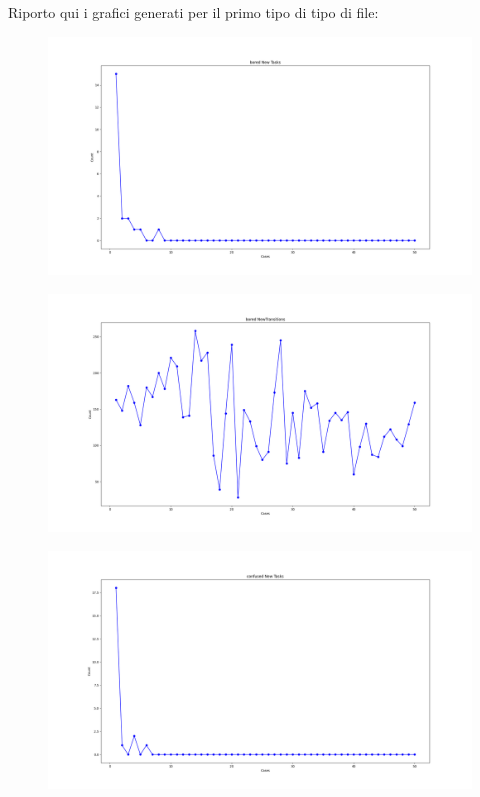 Riporto qui i grafici generati per il primo tipo di tipo di file:
\newpage
\begin{figure}  
    \centering
    \includegraphics[width=1\linewidth]{images/bored New Tasks.png}
\end{figure}
\begin{figure}
    \centering   
    \includegraphics[width=1\linewidth]{images/bored NewTransitions.png}
\end{figure}\clearpage
\begin{figure}
    \centering   
    \includegraphics[width=1\linewidth]{images/confused New Tasks.png}
\end{figure}
